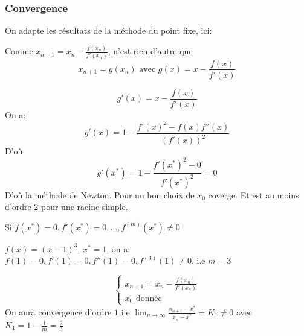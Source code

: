  \subsubsection*{Convergence}
 On adapte les résultats de la méthode du point fixe, ici:
 \par
 Comme $x_{n+1} = x_n - \frac{f(x_n)}{f'(x_n)}$, n'est rien d'autre que
 \[
 x_{n+1} = g(x_n) \text{ avec } g(x) = x - \frac{f(x)}{f'(x)}
 \] 
 \begin{remark}
    \[
    g'(x) = x - \frac{f(x)}{f'(x)}
    \]  
    On a:
    \[
    g'(x) = 1 - \frac{f'(x)^2 - f(x)f''(x)}{(f'(x))^2}
    \] 
    D'où
    \[
    g'(x^*) = 1 - \frac{f'(x^*)^2 - 0}{f'(x^*)^2} = 0
    \] 
    D'où la méthode de Newton. Pour un bon choix de $x_0$ coverge. Et est au moins d'ordre  $2$ pour une racine simple.
 \end{remark}

 \begin{remark}
     Si $f(x^*) = 0, f'(x^*) =0, \ldots, f^{(m)}(x^*) \neq 0$ 
     \begin{eg}
         $f(x) = (x - 1)^3$,  $x^* = 1$, on a: $f(1) = 0, f'(1) = 0, f''(1) = 0, f^{(3)}(1) \neq 0$, i.e $m=3$
     \end{eg}
     \[
     \begin{cases}
         x_{n+1} = x_n - \frac{f(x_n)}{f'(x_n)}\\
         x_0 \text{ donnée }
     \end{cases}
     \] 
     On aura convergence d'ordre $1$ i.e  $\lim_{n \to \infty} \frac{x_{n+1} - x^*}{x_n - x^*} = K_1 \neq 0$ avec $K_1 = 1 - \frac{1}{m} = \frac{2}{3}$
 \end{remark}
